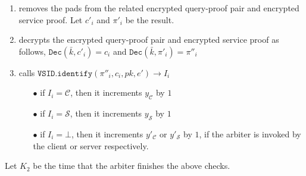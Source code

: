 \begin{enumerate}
\begin{enumerate}
\begin{enumerate}
\item removes the pads from the related encrypted    query-proof pair and encrypted service proof. Let $c'_{\scriptscriptstyle i}$ and $\pi'_{\scriptscriptstyle i}$ be the result. %
\item decrypts the encrypted query-proof pair and encrypted service proof as follows, $ \mathtt{Dec}(\bar{k},c'_{\scriptscriptstyle i})=c_{\scriptscriptstyle i}$ and 
$ \mathtt{Dec}(\bar{k},\pi'_{\scriptscriptstyle i})=\pi''_{\scriptscriptstyle i}$ 
\item\label{arbiter-identify} calls   $\mathtt{VSID.identify}(\pi''_{\scriptscriptstyle i},c_{\scriptscriptstyle i},pk,e')\rightarrow I_{\scriptscriptstyle i}$
\begin{enumerate}
\item[$\bullet$] if $I_{\scriptscriptstyle i}=\mathcal C$, then it increments $y_{\scriptscriptstyle\mathcal C}$ by $1$ 
\item[$\bullet$]  if $I_{\scriptscriptstyle i}=\mathcal S$, then it increments $y_{\scriptscriptstyle\mathcal S}$ by $1$ 
\item[$\bullet$]  if $I_{\scriptscriptstyle i}=\bot$, then it increments  $y'_{\scriptscriptstyle\mathcal C}$ or $y'_{\scriptscriptstyle\mathcal S}$ by $1$, if the arbiter is invoked by the client or server respectively. 
\end{enumerate}
\end{enumerate}

%
%
%
%
Let $K_{\scriptscriptstyle 2}$ be the time that the arbiter finishes the above checks.


\end{enumerate}
\end{enumerate}
